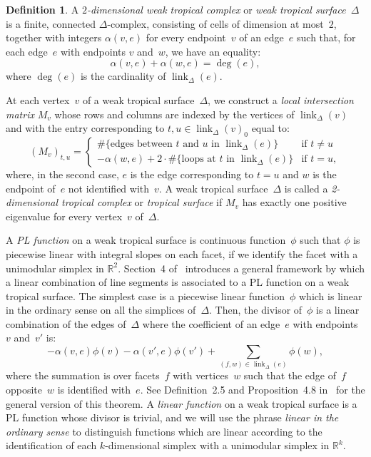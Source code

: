 \documentclass[11pt]{amsart}
\theoremstyle{definition}
\newtheorem{defn}[thm]{Definition}
\newcommand{\defi}[1]{\emph{#1}}
\newcommand{\link}{\operatorname{link}}
\newcommand{\RR}{\mathbb R}
\begin{document}
\begin{defn}
A \defi{$2$-dimensional weak tropical complex} or \defi{weak tropical
surface}~$\Delta$
is a finite, connected $\Delta$-complex, consisting of cells of dimension at
most~$2$, together with integers $\alpha(v, e)$
for every endpoint~$v$ of an edge~$e$ such that,
for each edge~$e$ with endpoints $v$ and~$w$, we have an equality:
\begin{equation}\label{eq:constraint}
\alpha(v, e) + \alpha(w, e) = \deg(e),
\end{equation}
where $\deg(e)$ is the cardinality of $\link_\Delta(e)$.

At each vertex~$v$ of a weak tropical surface~$\Delta$, we construct a
\defi{local intersection matrix} $M_v$ whose rows and columns are indexed by the
vertices of $\link_\Delta(v)$ and with the entry corresponding to $t, u \in
\link_\Delta(v)_0$ equal to:
\begin{equation*}
(M_{v})_{t,u} = \begin{cases}
\#\{\mbox{edges between $t$ and~$u$ in $\link_\Delta(e)$}\} &
\mbox{if } t \neq u \\
-\alpha(w, e) + 2 \cdot \#\{\mbox{loops at $t$ in $\link_\Delta(e)$}\} &
\mbox{if } t = u,
\end{cases}
\end{equation*}
where, in the second case, $e$ is the edge corresponding to $t=u$ and $w$ is
the endpoint of~$e$ not identified with~$v$.
A weak tropical surface~$\Delta$ is called a \defi{2-dimensional tropical
complex} or \defi{tropical surface} if $M_v$
has exactly one positive eigenvalue for every vertex~$v$ of~$\Delta$.
\end{defn}

A \defi{PL function} on a weak tropical surface is continuous function~$\phi$
such that $\phi$ is piecewise linear with integral slopes on each facet, if we
identify the facet with a unimodular simplex in $\RR^2$. Section~4
of~\cite{cartwright-complexes} introduces a general framework by which a linear
combination of line segments is associated to a PL function on a weak tropical
surface. The simplest case is a piecewise linear function~$\phi$ which is linear
in the ordinary sense on all the simplices of~$\Delta$. Then, the divisor
of~$\phi$ is a linear combination of the edges of~$\Delta$ where the
coefficient of an edge~$e$ with endpoints $v$ and~$v'$ is:
\begin{equation}\label{eq:linear-on-simplices}
-\alpha(v, e) \phi(v) - \alpha(v', e) \phi(v') + \sum_{(f, w) \in
\link_\Delta(e)} \phi(w), 
\end{equation}
where the summation is over facets~$f$ with vertices~$w$ such that the edge
of~$f$ opposite~$w$ is identified with~$e$. See Definition~2.5 and
Proposition~4.8 in~\cite{cartwright-complexes} for the general version of this
theorem. A \defi{linear function} on a weak tropical surface is a PL function
whose divisor is trivial, and we will use the phrase \defi{linear in the
ordinary sense} to distinguish functions which are linear according to the
identification of each $k$-dimensional simplex with a unimodular simplex in
$\RR^k$.
\end{document}
